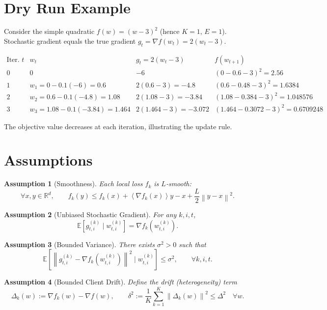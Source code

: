 \documentclass{article}
\newcommand{\E}{\mathbb{E}}
\newcommand{\R}{\mathbb{R}}
\newcommand{\norm}[1]{\left\|#1\right\|}
\newcommand{\inner}[1]{\left\langle#1\right\rangle}
\newtheorem{assumption}{Assumption}
\begin{document}
\section*{Dry Run Example}
Consider the simple quadratic $f(w)=(w-3)^2$ (hence $K=1$, $E=1$).  
Stochastic gradient equals the true gradient $g_t=\nabla f(w_t)=2(w_t-3)$.  

\[
\begin{array}{c|c|c|c}
\text{Iter. }t & w_t & g_t=2(w_t-3) & f(w_{t+1})\\ \hline
0 & 0 & -6 & (0-0.6-3)^2=2.56\\
1 & w_1=0-0.1(-6)=0.6 & 2(0.6-3)=-4.8 & (0.6-0.48-3)^2=1.6384\\
2 & w_2=0.6-0.1(-4.8)=1.08 & 2(1.08-3)=-3.84 & (1.08-0.384-3)^2=1.048576\\
3 & w_3=1.08-0.1(-3.84)=1.464 & 2(1.464-3)=-3.072 & (1.464-0.3072-3)^2=0.6709248
\end{array}
\]

The objective value decreases at each iteration, illustrating the update rule.

\newpage
\section*{Assumptions}
\begin{assumption}[Smoothness]\label{as:smooth}
Each local loss $f_k$ is $L$‑smooth:
\[
\forall x,y\in\R^d,\qquad 
f_k(y)\le f_k(x)+\inner{\nabla f_k(x)}{y-x}+\frac{L}{2}\norm{y-x}^2 .
\]
\end{assumption}

\begin{assumption}[Unbiased Stochastic Gradient]\label{as:unbiased}
For any $k,i,t$,
\[
\E\!\left[g_{t,i}^{(k)}\mid w_{t,i}^{(k)}\right]=\nabla f_k\!\left(w_{t,i}^{(k)}\right).
\]
\end{assumption}

\begin{assumption}[Bounded Variance]\label{as:variance}
There exists $\sigma^2>0$ such that
\[
\E\!\left[\norm{g_{t,i}^{(k)}-\nabla f_k\!\left(w_{t,i}^{(k)}\right)}^2\mid w_{t,i}^{(k)}\right]\le\sigma^2,
\qquad\forall k,i,t .
\]
\end{assumption}

\begin{assumption}[Bounded Client Drift]\label{as:drift}
Define the drift (heterogeneity) term
\[
\Delta_k(w):=\nabla f_k(w)-\nabla f(w),\qquad 
\delta^2:=\frac1K\sum_{k=1}^{K}\norm{\Delta_k(w)}^2\le \Delta^2\quad\forall w .
\]
\end{assumption}
\end{document}
